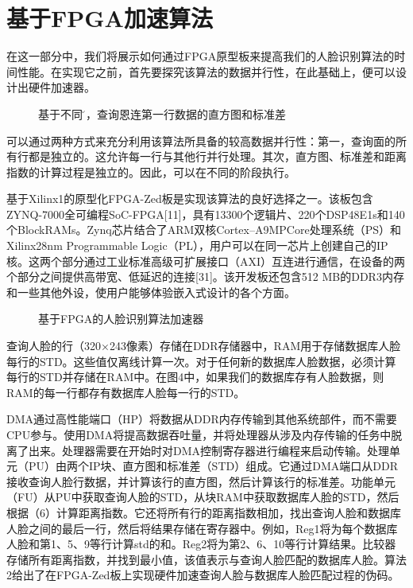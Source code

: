 
\chapter{基于FPGA加速算法}
\label{chap04}
在这一部分中，我们将展示如何通过FPGA原型板来提高我们的人脸识别算法的时间性能。在实现它之前，首先要探究该算法的数据并行性，在此基础上，便可以设计出硬件加速器。
\begin{figure}
	\centering
	\caption{\song\wuhao 基于不同\u 值，查询恩连第一行数据的直方图和标准差}

\end{figure}
可以通过两种方式来充分利用该算法所具备的较高数据并行性：第一，查询面的所有行都是独立的。这允许每一行与其他行并行处理。其次，直方图、标准差和距离指数的计算过程是独立的。因此，可以在不同的阶段执行。

基于Xilinx1的原型化FPGA-Zed板是实现该算法的良好选择之一。该板包含ZYNQ-7000全可编程SoC-FPGA[11]，具有13300个逻辑片、220个DSP48E1s和140个BlockRAMs。Zynq芯片结合了ARM双核Cortex–A9MPCore处理系统（PS）和Xilinx28nm Programmable Logic（PL），用户可以在同一芯片上创建自己的IP核。这两个部分通过工业标准高级可扩展接口（AXI）互连进行通信，在设备的两个部分之间提供高带宽、低延迟的连接[31]。该开发板还包含512 MB的DDR3内存和一些其他外设，使用户能够体验嵌入式设计的各个方面。
\begin{figure}
	\centering
	\caption{\song\wuhao 基于FPGA的人脸识别算法加速器}

\end{figure}
查询人脸的行（320×243像素）存储在DDR存储器中，RAM用于存储数据库人脸每行的STD。这些值仅离线计算一次。对于任何新的数据库人脸数据，必须计算每行的STD并存储在RAM中。在图4中，如果我们的数据库存有人脸数据，则RAM的每一行都存有数据库人脸每一行的STD。

	DMA通过高性能端口（HP）将数据从DDR内存传输到其他系统部件，而不需要CPU参与。使用DMA将提高数据吞吐量，并将处理器从涉及内存传输的任务中脱离了出来。处理器需要在开始时对DMA控制寄存器进行编程来启动传输。处理单元（PU）由两个IP块、直方图和标准差（STD）组成。它通过DMA端口从DDR接收查询人脸行数据，并计算该行的直方图，然后计算该行的标准差。功能单元（FU）从PU中获取查询人脸的STD，从块RAM中获取数据库人脸的STD，然后根据（6）计算距离指数。它还将所有行的距离指数相加，找出查询人脸和数据库人脸之间的最后一行，然后将结果存储在寄存器中。例如，Reg1将为每个数据库人脸和第1、5、9等行计算std的和。Reg2将为第2、6、10等行计算结果。比较器存储所有距离指数，并找到最小值，该值表示与查询人脸匹配的数据库人脸。算法2给出了在FPGA-Zed板上实现硬件加速查询人脸与数据库人脸匹配过程的伪码。
	
